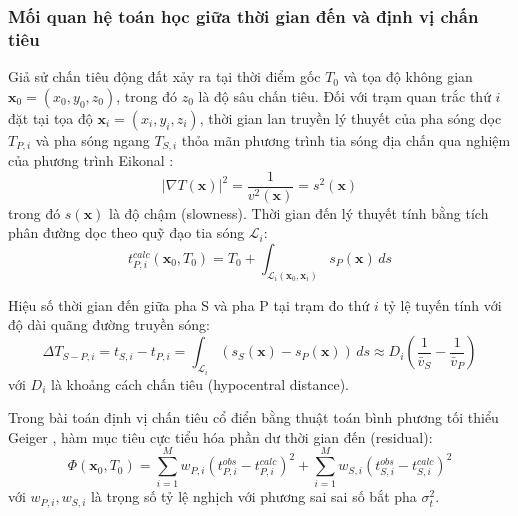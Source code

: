 \documentclass[preprint,1p]{elsarticle}
\begin{document}
\subsubsection{Mối quan hệ toán học giữa thời gian đến và định vị chấn tiêu}
Giả sử chấn tiêu động đất xảy ra tại thời điểm gốc $T_0$ và tọa độ không gian $\mathbf{x}_0 = (x_0, y_0, z_0)$, trong đó $z_0$ là độ sâu chấn tiêu. Đối với trạm quan trắc thứ $i$ đặt tại tọa độ $\mathbf{x}_i = (x_i, y_i, z_i)$, thời gian lan truyền lý thuyết của pha sóng dọc $T_{P,i}$ và pha sóng ngang $T_{S,i}$ thỏa mãn phương trình tia sóng địa chấn qua nghiệm của phương trình Eikonal \cite{aki2002quantitative}:
\begin{equation}
|\nabla T(\mathbf{x})|^2 = \frac{1}{v^2(\mathbf{x})} = s^2(\mathbf{x})
\label{eq:eikonal}
\end{equation}
trong đó $s(\mathbf{x})$ là độ chậm (slowness). Thời gian đến lý thuyết tính bằng tích phân đường dọc theo quỹ đạo tia sóng $\mathcal{L}_i$:
\begin{equation}
t_{P,i}^{calc}(\mathbf{x}_0, T_0) = T_0 + \int_{\mathcal{L}_i(\mathbf{x}_0, \mathbf{x}_i)} s_P(\mathbf{x}) \, ds
\label{eq:travel_time_integral}
\end{equation}

Hiệu số thời gian đến giữa pha S và pha P tại trạm đo thứ $i$ tỷ lệ tuyến tính với độ dài quãng đường truyền sóng:
\begin{equation}
\Delta T_{S-P, i} = t_{S,i} - t_{P,i} = \int_{\mathcal{L}_i} \left(s_S(\mathbf{x}) - s_P(\mathbf{x})\right) \, ds \approx D_i \left(\frac{1}{\bar{v}_S} - \frac{1}{\bar{v}_P}\right)
\label{eq:ts_tp_diff}
\end{equation}
với $D_i$ là khoảng cách chấn tiêu (hypocentral distance).

Trong bài toán định vị chấn tiêu cổ điển bằng thuật toán bình phương tối thiểu Geiger \cite{klein2002user}, hàm mục tiêu cực tiểu hóa phần dư thời gian đến (residual):
\begin{equation}
\Phi(\mathbf{x}_0, T_0) = \sum_{i=1}^{M} w_{P,i} \left( t_{P,i}^{obs} - t_{P,i}^{calc} \right)^2 + \sum_{i=1}^{M} w_{S,i} \left( t_{S,i}^{obs} - t_{S,i}^{calc} \right)^2
\label{eq:geiger_objective}
\end{equation}
với $w_{P,i}, w_{S,i}$ là trọng số tỷ lệ nghịch với phương sai sai số bắt pha $\sigma_t^2$.
\end{document}
